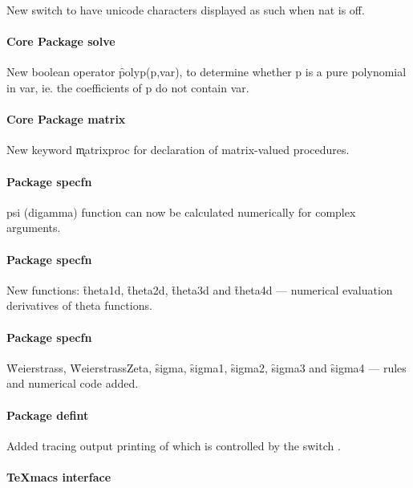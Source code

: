 New switch  to have unicode characters
displayed as such when nat is off.

\paragraph*{Core Package solve}

New boolean operator \f{polyp}(p,var), to determine whether p is a pure polynomial
in var, ie. the coefficients of p do not contain var.

\paragraph*{Core Package matrix}

New keyword \k{matrixproc} for declaration of matrix-valued procedures.

\paragraph{Package specfn}

psi (digamma) function can now be calculated numerically for complex arguments.

\paragraph{Package specfn}

New functions: \f{theta1d}, \f{theta2d}, \f{theta3d} and \f{theta4d}
--- numerical evaluation derivatives of theta functions.

\paragraph{Package specfn}

\f{Weierstrass}, \f{WeierstrassZeta}, \f{sigma}, \f{sigma1}, \f{sigma2},
\f{sigma3} and \f{sigma4}  --- rules and numerical code added.

\paragraph{Package defint}

Added tracing output printing of which is controlled by the switch .

\paragraph{TeXmacs interface}

